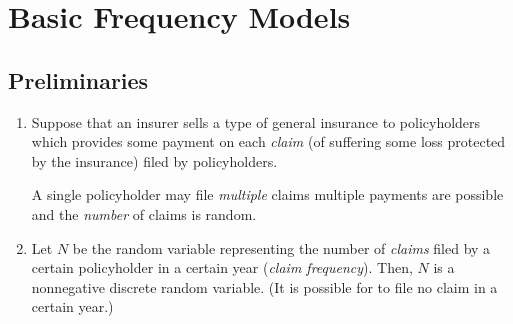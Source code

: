 \section{Basic Frequency Models}
\label{sect:freq-model}
\subsection{Preliminaries}
\begin{enumerate}
\item Suppose that an insurer  sells a type of general
insurance to policyholders which provides some payment  on
each \emph{claim}  (of suffering some loss
protected by the insurance) filed by policyholders.

\begin{note}
A single policyholder  may file \emph{multiple} claims
 multiple payments   are possible and
the \emph{number} of claims is random.
\end{note}

\item Let \(N\) be the random variable representing the number of \emph{claims}
 filed by a certain policyholder  in a
certain year (\emph{claim frequency}). Then, \(N\) is a nonnegative discrete
random variable. (It is possible for  to file no claim in a
certain year.)


\end{enumerate}
